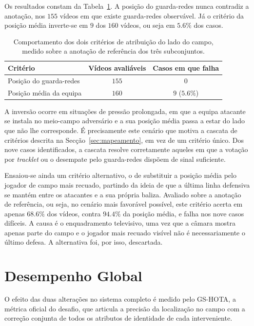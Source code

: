 Os resultados constam da Tabela~\ref{tab:lado-inversoes}. A posição do guarda-redes nunca contradiz a anotação, nos $155$ vídeos em que existe guarda-redes observável. Já o critério da posição média inverte-se em $9$ dos $160$ vídeos, ou seja em $5.6\%$ dos casos.

\begin{table}[htbp]
    \centering
    \caption{Comportamento dos dois critérios de atribuição do lado do campo, medido sobre a
    anotação de referência dos três subconjuntos.}
    \label{tab:lado-inversoes}
    \begin{tabular}{lcc}
        \hline
        \textbf{Critério} & \textbf{Vídeos avaliáveis} & \textbf{Casos em que falha} \\
        \hline
        Posição do guarda-redes  & $155$ & $0$ \\
        Posição média da equipa  & $160$ & $9$ ($5.6\%$) \\
        \hline
    \end{tabular}
\end{table}

A inversão ocorre em situações de pressão prolongada, em que a equipa atacante se instala no meio-campo adversário e a sua posição média passa a estar do lado que não lhe corresponde. É precisamente este cenário que motiva a cascata de critérios descrita na Secção~\ref{sec:mapeamento}, em vez de um critério único. Dos nove casos identificados, a cascata resolve corretamente aqueles em que a votação por \emph{tracklet} ou o desempate pelo guarda-redes dispõem de sinal suficiente.

Ensaiou-se ainda um critério alternativo, o de substituir a posição média pelo jogador de campo mais recuado, partindo da ideia de que a última linha defensiva se mantém entre os atacantes e a sua própria baliza. Avaliado sobre a anotação de referência, ou seja, no cenário mais favorável possível, este critério acerta em apenas $68.6\%$ dos vídeos, contra $94.4\%$ da posição média, e falha nos nove casos difíceis. A causa é o enquadramento televisivo, uma vez que a câmara mostra apenas parte do campo e o jogador mais recuado visível não é necessariamente o último defesa. A alternativa foi, por isso, descartada.

\section{Desempenho Global}\label{sec:desempenho-global}

O efeito das duas alterações no sistema completo é medido pelo GS-HOTA, a métrica oficial do desafio, que articula a precisão da localização no campo com a correção conjunta de todos os atributos de identidade de cada interveniente.

